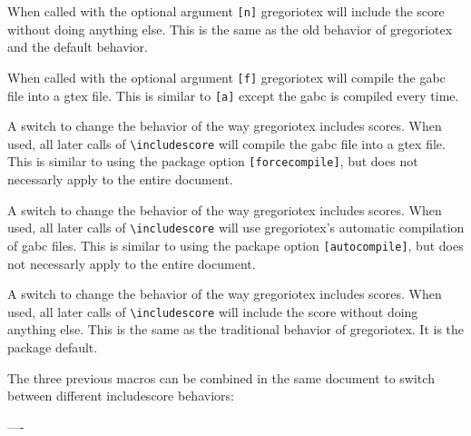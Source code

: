 When called with the optional argument \texttt{[n]} gregoriotex will
include the score without doing anything else. This is the same as the
old behavior of gregoriotex and the default behavior.

When called with the optional argument \texttt{[f]} gregoriotex will
compile the gabc file into a gtex file. This is similar to
\texttt{[a]} except the gabc is compiled every time.

 A switch
to change the behavior of the way gregoriotex includes scores. When
used, all later calls of \verb=\includescore= will compile the gabc
file into a gtex file. This is similar to using the package option
\verb=[forcecompile]=, but does not necessarly apply to the entire
document.

 A switch
to change the behavior of the way gregoriotex includes scores. When
used, all later calls of \verb=\includescore= will use gregoriotex's
automatic compilation of gabc files. This is similar to using the
packape option \verb=[autocompile]=, but does not necessarly apply to
the entire document.

 A switch
to change the behavior of the way gregoriotex includes scores. When
used, all later calls of \verb=\includescore= will include the score
without doing anything else. This is the same as the traditional
behavior of gregoriotex. It is the package default.

\medskip The three previous macros can be combined in the same document to
switch between different includescore behaviors: \par\medskip
\begin{latexcode}
  \usepackage{gregoriotex} %
  ----

  \autocompilegabc

  \forcecompilegabc
\end{latexcode}

